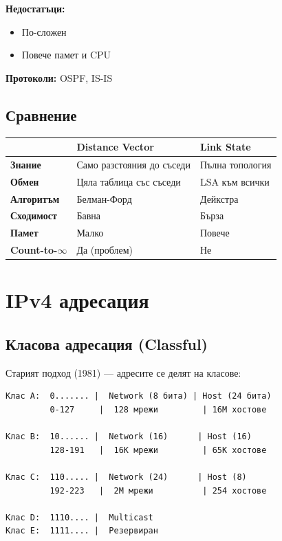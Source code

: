 \documentclass[12pt,a4paper]{article}
\begin{document}
\textbf{Недостатъци:}
\begin{itemize}
    \item[$\times$] По-сложен
    \item[$\times$] Повече памет и CPU
\end{itemize}

\textbf{Протоколи:} OSPF, IS-IS

\subsection{Сравнение}

\begin{center}
\begin{tabular}{|l|l|l|}
\hline
& \textbf{Distance Vector} & \textbf{Link State} \\
\hline
\textbf{Знание} & Само разстояния до съседи & Пълна топология \\
\hline
\textbf{Обмен} & Цяла таблица със съседи & LSA към всички \\
\hline
\textbf{Алгоритъм} & Белман-Форд & Дейкстра \\
\hline
\textbf{Сходимост} & Бавна & Бърза \\
\hline
\textbf{Памет} & Малко & Повече \\
\hline
\textbf{Count-to-$\infty$} & Да (проблем) & Не \\
\hline
\end{tabular}
\end{center}

\newpage
\section{IPv4 адресация}

\subsection{Класова адресация (Classful)}

Старият подход (1981) — адресите се делят на класове:

\begin{lstlisting}
Клас A:  0....... |  Network (8 бита) | Host (24 бита)
         0-127     |  128 мрежи         | 16M хостове

Клас B:  10...... |  Network (16)      | Host (16)
         128-191   |  16K мрежи         | 65K хостове

Клас C:  110..... |  Network (24)      | Host (8)
         192-223   |  2M мрежи          | 254 хостове

Клас D:  1110.... |  Multicast
Клас E:  1111.... |  Резервиран
\end{lstlisting}
\end{document}
